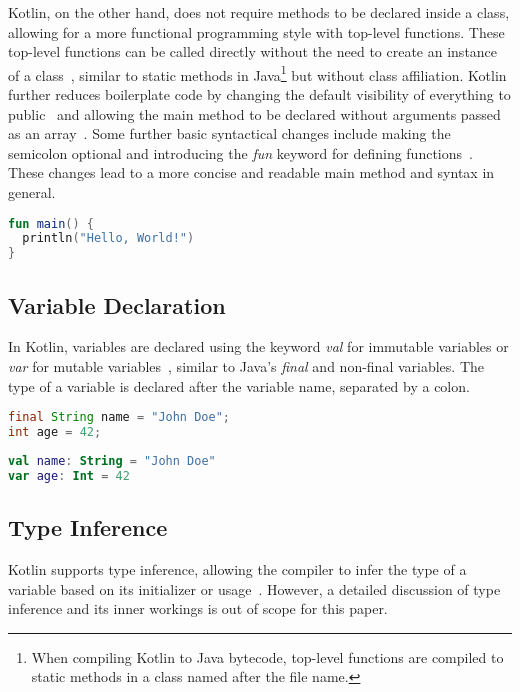 \documentclass[a4paper, 11pt]{article}
\begin{document}
Kotlin, on the other hand, does not require methods to be declared inside a class, allowing for a more functional programming style with top-level functions.
These top-level functions can be called directly without the need to create an instance of a class~\cite{kotlin-functions-scope}, similar to static methods in Java\footnote{When compiling Kotlin to Java bytecode, top-level functions are compiled to static methods in a class named after the file name.} but without class affiliation.
Kotlin further reduces boilerplate code by changing the default visibility of everything to public~\cite{visibility-modifiers} and allowing the main method to be declared without arguments passed as an array~\cite{program-entry-point}.
Some further basic syntactical changes include making the semicolon optional and introducing the \textit{fun} keyword for defining functions~\cite{functions}.
These changes lead to a more concise and readable main method and syntax in general.

\begin{lstlisting}[language=Kotlin,title={Kotlin main method}]
fun main() {
  println("Hello, World!")
}
\end{lstlisting}

\subsection{Variable Declaration}
In Kotlin, variables are declared using the keyword \textit{val} for immutable variables or \textit{var} for mutable variables~\cite{variables}, similar to Java's \textit{final} and non-final variables.
The type of a variable is declared after the variable name, separated by a colon.

\begin{lstlisting}[language=Java,title={Java data types}]
final String name = "John Doe";
int age = 42;
\end{lstlisting}

\begin{lstlisting}[language=Kotlin,title={Kotlin data types}]
val name: String = "John Doe"
var age: Int = 42
\end{lstlisting}

\subsection{Type Inference}
Kotlin supports type inference, allowing the compiler to infer the type of a variable based on its initializer or usage~\cite{type-inference}. 
However, a detailed discussion of type inference and its inner workings is out of scope for this paper.
\end{document}

